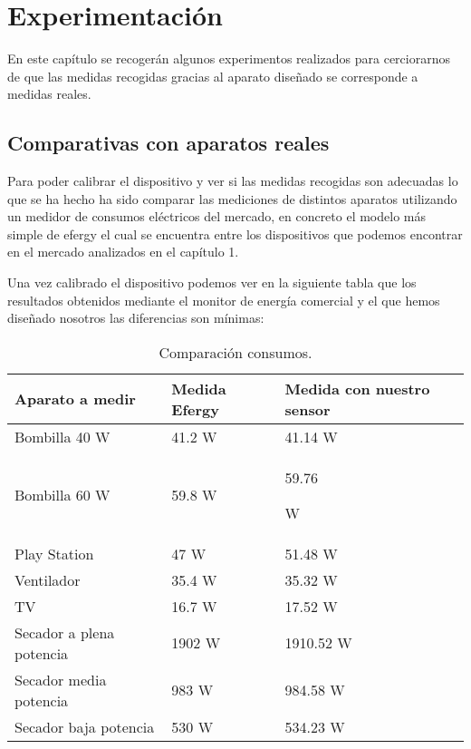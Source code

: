 \chapter{Experimentación}

En este capítulo se recogerán algunos experimentos realizados para cerciorarnos de que las medidas recogidas gracias al aparato diseñado se corresponde a medidas reales.

\section{Comparativas con aparatos reales}

Para poder calibrar el dispositivo y ver si las medidas recogidas son adecuadas lo que se ha hecho ha sido comparar las mediciones de distintos aparatos utilizando un medidor de consumos eléctricos del mercado, en concreto el modelo más simple de efergy el cual se encuentra entre los dispositivos que podemos encontrar en el mercado analizados en el capítulo 1.

Una vez calibrado el dispositivo podemos ver en la siguiente tabla que los resultados obtenidos mediante el monitor de energía comercial y el que hemos diseñado nosotros las diferencias son mínimas:

\begin{table}[H]
	\begin{center}
		\begin{tabular}{|l||l|l|}
			\hline
			Aparato a medir & Medida Efergy & Medida con nuestro sensor \\
			\hline \hline
			Bombilla 40 W & 41.2 W & 41.14
 W \\ \hline
			Bombilla 60 W & 59.8 W & 59.76

 W \\ \hline
			Play Station & 47 W & 51.48
 W \\ \hline
			Ventilador & 35.4 W & 35.32
 W \\ \hline
			TV & 16.7 W & 17.52
 W \\ \hline
			Secador a plena potencia & 1902 W & 1910.52
 W \\ \hline
			Secador media potencia & 983 W & 984.58
 W \\ \hline
			Secador baja potencia & 530 W & 534.23
 W \\ \hline
		\end{tabular}
		\caption{Comparación consumos.}
		\label{tabla:consumos aparatos}
	\end{center}
\end{table}

